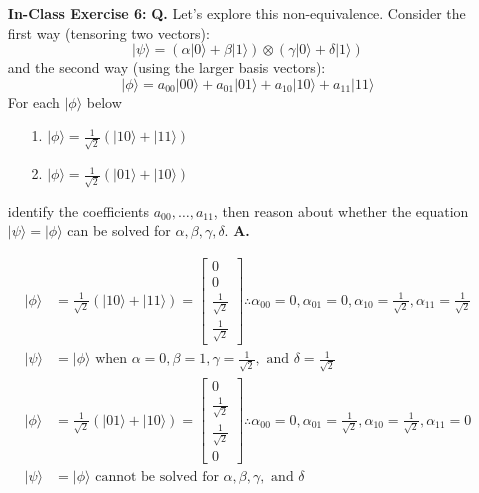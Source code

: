 \documentclass[main.tex]{subfiles}
\begin{document}
\begin{enumerate}
\item[] \textbf{In-Class Exercise 6:} \textbf{Q.} Let's explore this non-equivalence. Consider the first way (tensoring two vectors):
$$|\psi\rangle=(\alpha|0\rangle+\beta|1\rangle) \otimes(\gamma|0\rangle+\delta|1\rangle)$$
and the second way (using the larger basis vectors):
$$|\phi\rangle=a_{00}|00\rangle+a_{01}|01\rangle+a_{10}|10\rangle+a_{11}|11\rangle$$
For each $|\phi\rangle$ below
\begin{enumerate}
    \item[1.]$|\phi\rangle=\frac{1}{\sqrt{2}}(|10\rangle+|11\rangle)$
    \item[2.]$|\phi\rangle=\frac{1}{\sqrt{2}}(|01\rangle+|10\rangle)$
\end{enumerate}
 identify the coefficients $a_{00}, \ldots, a_{11}$, then reason about whether the equation $|\psi\rangle=|\phi\rangle$ can be solved for $\alpha, \beta, \gamma, \delta$. \textbf{A.}
 
    \begin{align*}
        |\phi\rangle    & = \frac{1}{\sqrt{2}}(|10\rangle+|11\rangle)
                        = \left[\begin{array}{l} 0 \\ 0 \\ \frac{1}{\sqrt{2}} \\ \frac{1}{\sqrt{2}} \end{array}\right]
                        \therefore \alpha_{00} = 0, \alpha_{01} = 0, \alpha_{10} = \frac{1}{\sqrt{2}}, \alpha_{11} = \frac{1}{\sqrt{2}}\\
        |\psi\rangle    & = |\phi\rangle \text{ when } \alpha = 0, \beta = 1, 
                        \gamma = \frac{1}{\sqrt{2}}, \text{ and } \delta = \frac{1}{\sqrt{2}}\\ 
        |\phi\rangle    & = \frac{1}{\sqrt{2}}(|01\rangle+|10\rangle)
                        = \left[\begin{array}{l} 0 \\ \frac{1}{\sqrt{2}} \\ \frac{1}{\sqrt{2}} \\ 0 \end{array}\right]
                        \therefore \alpha_{00} = 0, \alpha_{01} = \frac{1}{\sqrt{2}}, \alpha_{10} = \frac{1}{\sqrt{2}}, \alpha_{11} = 0\\
        |\psi\rangle    & = |\phi\rangle \text{ cannot be solved for } \alpha, \beta, \gamma, \text{ and } \delta
    \end{align*}
    

\end{enumerate}
\end{document}
